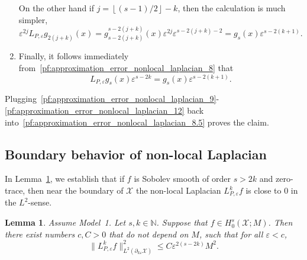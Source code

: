 \documentclass[aos]{imsart}
\theoremstyle{plain}
\newtheorem{lemma}{Lemma}
\theoremstyle{definition}
\theoremstyle{remark}
\newcommand{\mc}[1]{\mathcal{#1}}
\newcommand{\floor}[1]{\left\lfloor #1 \right\rfloor}
\newcommand{\1}{\mathbf{1}}
\begin{document}
\begin{enumerate}
	On the other hand if $j = \floor{(s - 1)/2} - k$, then the calculation is much simpler,
	\begin{equation}
	\label{pf:approximation_error_nonlocal_laplacian_11}
	\varepsilon^{2j} L_{P,\varepsilon}g_{2(j + k)}(x) = g_{s - 2(j + k)}^{s - 2(j + k)}(x) \varepsilon^{2j} \varepsilon^{s - 2(j + k) - 2} = g_s(x) \varepsilon^{s - 2(k + 1)}.
	\end{equation}
	\item Finally, it follows immediately from~\eqref{pf:approximation_error_nonlocal_laplacian_8} that
	\begin{equation}
	\label{pf:approximation_error_nonlocal_laplacian_12}
	L_{P,\varepsilon}g_s(x) \varepsilon^{s - 2k} = g_{s}(x) \varepsilon^{s - 2(k + 1)}.
	\end{equation}
\end{enumerate}
Plugging~\eqref{pf:approximation_error_nonlocal_laplacian_9}-\eqref{pf:approximation_error_nonlocal_laplacian_12} back into~\eqref{pf:approximation_error_nonlocal_laplacian_8.5} proves the claim.

\subsection{Boundary behavior of non-local Laplacian}
\label{subsec:boundary_behavior_nonlocal_laplacian}

In Lemma~\ref{lem:approximation_error_nonlocal_laplacian_boundary}, we establish that if $f$ is Sobolev smooth of order $s > 2k$ and zero-trace, then near the boundary of $\mc{X}$ the non-local Laplacian $L_{P,\varepsilon}^kf$ is close to $0$ in the $L^2$-sense.
\begin{lemma}
	\label{lem:approximation_error_nonlocal_laplacian_boundary}
	Assume Model~1. Let $s,k \in \mathbb{N}$. Suppose that $f \in H_0^{s}(\mc{X};M)$. Then there exist numbers $c,C > 0$ that do not depend on $M$, such that for all $\varepsilon < c$, 
	\begin{equation*}
	\|L_{P,\varepsilon}^kf\|_{L^2(\partial_{k\varepsilon}\mc{X})}^2 \leq C \varepsilon^{2(s - 2k)}M^2.
	\end{equation*}
\end{lemma}
\end{document}
